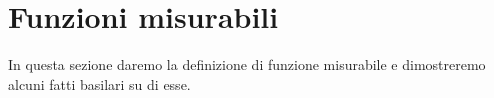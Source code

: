 \section{Funzioni misurabili}

In questa sezione daremo la definizione di funzione misurabile e dimostreremo alcuni fatti basilari su di esse.
